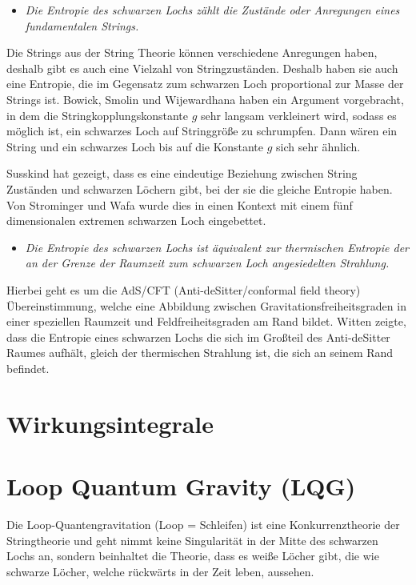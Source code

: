 \documentclass[ngerman]{scrartcl}
\begin{document}
	\begin{itemize}
		\item [~] \textit{Die Entropie des schwarzen Lochs zählt die Zustände oder Anregungen eines fundamentalen Strings.}
	\end{itemize}
	Die Strings aus der String Theorie können verschiedene Anregungen haben, deshalb gibt es auch eine Vielzahl von Stringzuständen. Deshalb haben sie auch eine Entropie, die im Gegensatz zum schwarzen Loch proportional zur Masse der Strings ist. Bowick, Smolin und Wijewardhana \cite{BowickSmolinWijewardhana} haben ein Argument vorgebracht, in dem die Stringkopplungskonstante $g$ sehr langsam verkleinert wird, sodass es möglich ist, ein schwarzes Loch auf Stringgröße zu schrumpfen. Dann wären ein String und ein schwarzes Loch bis auf die Konstante $g$ sich sehr ähnlich.
	
	Susskind \cite{Susskind} hat gezeigt, dass es eine eindeutige Beziehung zwischen String Zuständen und schwarzen Löchern gibt, bei der sie die gleiche Entropie haben. Von Strominger und Wafa \cite{StromingerWafa} wurde dies in einen Kontext mit einem fünf dimensionalen extremen schwarzen Loch eingebettet. 
	
	\begin{itemize}
		\item [~] \textit{Die Entropie des schwarzen Lochs ist äquivalent zur thermischen Entropie der an der Grenze der Raumzeit zum schwarzen Loch angesiedelten Strahlung.}
	\end{itemize}
	Hierbei geht es um die AdS/CFT (Anti-deSitter/conformal field theory) Übereinstimmung, welche eine Abbildung zwischen Gravitationsfreiheitsgraden in einer speziellen Raumzeit und Feldfreiheitsgraden am Rand bildet. 
	Witten \cite{Witten} zeigte, dass die Entropie eines schwarzen Lochs die sich im Großteil des Anti-deSitter Raumes aufhält, gleich der thermischen Strahlung ist, die sich an seinem Rand befindet. 
	
\section{Wirkungsintegrale}

\section{Loop Quantum Gravity (LQG)}	
Die Loop-Quantengravitation (Loop = Schleifen) ist eine Konkurrenztheorie der Stringtheorie und geht nimmt keine Singularität in der Mitte des schwarzen Lochs an, sondern beinhaltet die Theorie, dass es weiße Löcher gibt, die wie schwarze Löcher, welche rückwärts in der Zeit leben, aussehen. 
\end{document}
